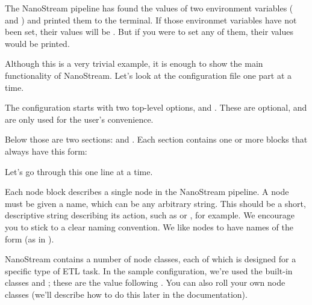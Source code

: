 \documentclass[letterpaper,10pt,english]{sphinxmanual}
\begin{document}
The NanoStream pipeline has found the values of two environment variables ( and ) and printed them to the terminal. If those environmet variables have not been set, their values will be . But if you were to set any of them, their values would be printed.

Although this is a very trivial example, it is enough to show the main functionality of NanoStream. Let’s look at the configuration file one
part at a time.

The configuration starts with two top-level options,  and . These are optional, and are only used for the user’s convenience.

Below those are two sections:  and . Each  section contains one or more blocks that always have this form:

%
\begin{sphinxVerbatim}[commandchars=\\\{\}]
    
         
        
        
\end{sphinxVerbatim}

Let’s go through this one line at a time.

Each node block describes a single node in the NanoStream pipeline. A node
must be given a name, which can be any arbitrary string. This should be a
short, descriptive string describing its action, such as  or , for example. We encourage
you to stick to a clear naming convention. We like nodes to have names of
the form  (as in ).

NanoStream contains a number of node classes, each of which is designed
for a specific type of ETL task. In the sample configuration, we’re used
the built-in classes  and ; these are the value following . You can also roll your own node classes (we’ll describe how to do this later in the documentation).
\end{document}
